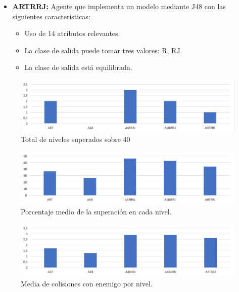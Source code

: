 \documentclass[10pt, spanish, pdftex]{../.template/template}
\begin{document}
{{\begin{itemize}
    \item \textbf{ARTRRJ:} Agente que implementa un modelo mediante J48 con las siguientes características:
    \begin{itemize}
        \item Uso de 14 atributos relevantes.
        \item La clase de salida puede tomar tres valores: R, RJ.
        \item La clase de salida está equilibrada.
    \end{itemize}
\end{itemize}
}
\newpage
{}
\begin{figure}[h]
    \includegraphics[width=170mm]{nivsup}
    \caption{Total de niveles superados sobre 40} %
    \label{nivsup}
\end{figure}

\begin{figure}[h]
    \includegraphics[width=170mm]{porcentaje}
    \caption{ Porcentaje medio de la superación en cada nivel.} %
    \label{porcentaje}
\end{figure}

\begin{figure}[h]
    \includegraphics[width=170mm]{nivel}
    \caption{ Media de colisiones con enemigo por nivel.} %
    \label{nivel}
\end{figure}

}
\end{document}
